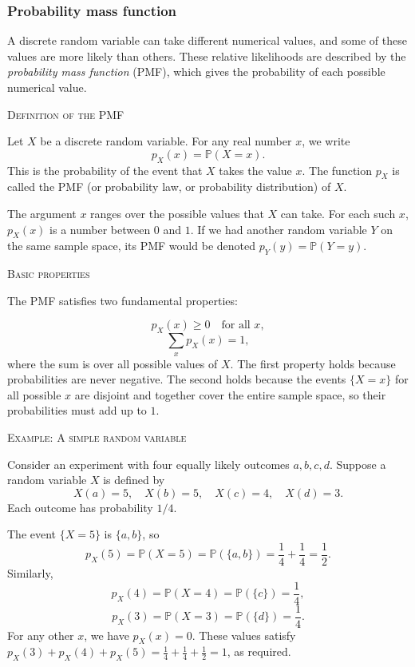 \subsubsection{Probability mass function}

A discrete random variable can take different numerical values, and some of these values are more likely than others.  
These relative likelihoods are described by the \textit{probability mass function} (PMF), which gives the probability of each possible numerical value.

\bigskip\textsc{Definition of the PMF}

Let \(X\) be a discrete random variable.  
For any real number \(x\), we write
\[
p_X(x) = \mathbb{P}(X = x).
\]
This is the probability of the event that \(X\) takes the value \(x\).  
The function \(p_X\) is called the PMF (or probability law, or probability distribution) of \(X\).  

The argument \(x\) ranges over the possible values that \(X\) can take.  
For each such \(x\), \(p_X(x)\) is a number between \(0\) and \(1\).  
If we had another random variable \(Y\) on the same sample space, its PMF would be denoted \(p_Y(y) = \mathbb{P}(Y = y)\).

\bigskip\textsc{Basic properties}

The PMF satisfies two fundamental properties:

\[
p_X(x) \ge 0 \quad \text{for all } x,
\]
\[
\sum_{x} p_X(x) = 1,
\]
where the sum is over all possible values of \(X\).  
The first property holds because probabilities are never negative.  
The second holds because the events \(\{X = x\}\) for all possible \(x\) are disjoint and together cover the entire sample space, so their probabilities must add up to \(1\).

\bigskip\textsc{Example: A simple random variable}

Consider an experiment with four equally likely outcomes \(a, b, c, d\).  
Suppose a random variable \(X\) is defined by
\[
X(a) = 5, \quad X(b) = 5, \quad X(c) = 4, \quad X(d) = 3.
\]
Each outcome has probability \(1/4\).  

The event \(\{X = 5\}\) is \(\{a, b\}\), so
\[
p_X(5) = \mathbb{P}(X = 5) = \mathbb{P}(\{a, b\}) = \frac{1}{4} + \frac{1}{4} = \frac{1}{2}.
\]
Similarly,
\[
p_X(4) = \mathbb{P}(X = 4) = \mathbb{P}(\{c\}) = \frac{1}{4},
\]
\[
p_X(3) = \mathbb{P}(X = 3) = \mathbb{P}(\{d\}) = \frac{1}{4}.
\]
For any other \(x\), we have \(p_X(x) = 0\).  
These values satisfy \(p_X(3) + p_X(4) + p_X(5) = \frac{1}{4} + \frac{1}{4} + \frac{1}{2} = 1\), as required.

